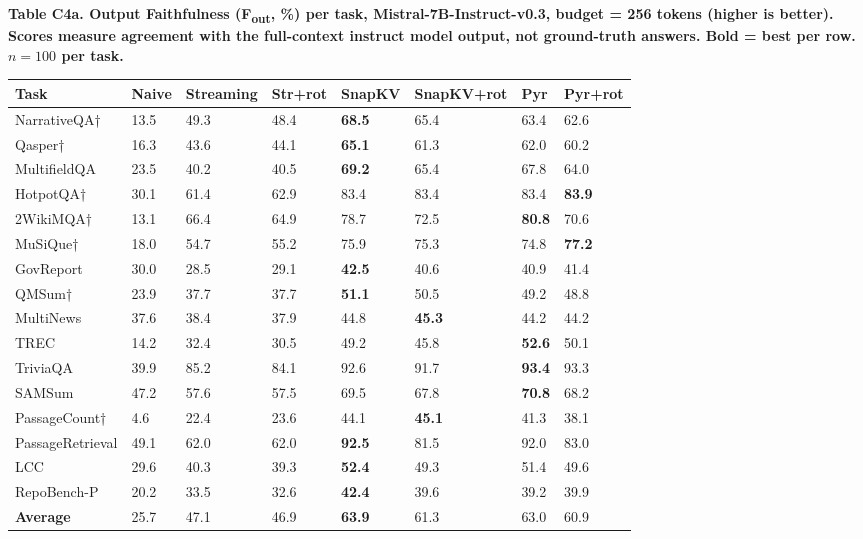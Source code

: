 \documentclass[10pt,letterpaper]{article}
\begin{document}
\textbf{Table C4a. Output Faithfulness (F\textsubscript{out}, \%) per task, Mistral-7B-Instruct-v0.3,
budget = 256 tokens (higher is better). Scores measure agreement with the full-context
instruct model output, not ground-truth answers. Bold = best per row.
$n = 100$ per task.}

\nopagebreak
\begin{table}[H]
\centering
\small
\begin{tabular}{@{}llllllll@{}}
\toprule
Task & Naive & Streaming & Str+rot & SnapKV & SnapKV+rot & Pyr &
Pyr+rot\\
\midrule
NarrativeQA† & 13.5 & 49.3 & 48.4 & \textbf{68.5} & 65.4 & 63.4 &
62.6\\
Qasper† & 16.3 & 43.6 & 44.1 & \textbf{65.1} & 61.3 & 62.0 &
60.2\\
MultifieldQA & 23.5 & 40.2 & 40.5 & \textbf{69.2} & 65.4 & 67.8 &
64.0\\
HotpotQA† & 30.1 & 61.4 & 62.9 & 83.4 & 83.4 & 83.4 &
\textbf{83.9}\\
2WikiMQA† & 13.1 & 66.4 & 64.9 & 78.7 & 72.5 & \textbf{80.8} &
70.6\\
MuSiQue† & 18.0 & 54.7 & 55.2 & 75.9 & 75.3 & 74.8 &
\textbf{77.2}\\
GovReport & 30.0 & 28.5 & 29.1 & \textbf{42.5} & 40.6 & 40.9 &
41.4\\
QMSum† & 23.9 & 37.7 & 37.7 & \textbf{51.1} & 50.5 & 49.2 &
48.8\\
MultiNews & 37.6 & 38.4 & 37.9 & 44.8 & \textbf{45.3} & 44.2 &
44.2\\
TREC & 14.2 & 32.4 & 30.5 & 49.2 & 45.8 & \textbf{52.6} &
50.1\\
TriviaQA & 39.9 & 85.2 & 84.1 & 92.6 & 91.7 & \textbf{93.4} &
93.3\\
SAMSum & 47.2 & 57.6 & 57.5 & 69.5 & 67.8 & \textbf{70.8} &
68.2\\
PassageCount† & 4.6 & 22.4 & 23.6 & 44.1 & \textbf{45.1} & 41.3 &
38.1\\
PassageRetrieval & 49.1 & 62.0 & 62.0 & \textbf{92.5} & 81.5 & 92.0 &
83.0\\
LCC & 29.6 & 40.3 & 39.3 & \textbf{52.4} & 49.3 & 51.4 &
49.6\\
RepoBench-P & 20.2 & 33.5 & 32.6 & \textbf{42.4} & 39.6 & 39.2 &
39.9\\
\textbf{Average} & 25.7 & 47.1 & 46.9 & \textbf{63.9} & 61.3 & 63.0 &
60.9\\
\bottomrule
\end{tabular}
\end{table}
\end{document}
